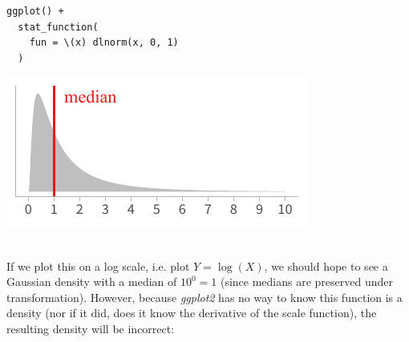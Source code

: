 \documentclass[journal]{vgtc}                     %
\begin{document}
\noindent
\begin{minipage}{.5\columnwidth}
\small
\begin{verbatim}
ggplot() +
  stat_function(
    fun = \(x) dlnorm(x, 0, 1)
  )
\end{verbatim}
\end{minipage}%
  \begin{minipage}{.4\columnwidth}
    \centering
    \includegraphics[width=1.2\columnwidth]{figs/3-jacobian-lognorm.pdf}
  \end{minipage}
\vspace{.5\belowdisplayskip}\\
If we plot this on a log scale, i.e. plot $Y = \log(X)$, we should hope to see a Gaussian density with a median of $10^0 = 1$ (since medians are preserved under transformation). However, because \textit{ggplot2} has no way to know this function is a density (nor if it did, does it know the derivative of the scale function), the resulting density will be incorrect:
\end{document}
